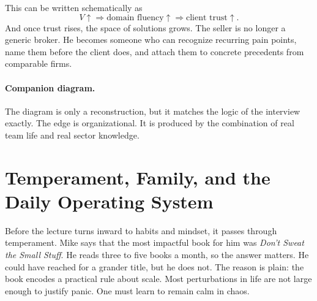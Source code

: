 This can be written schematically as
\begin{equation}
V \uparrow \Longrightarrow \text{domain fluency} \uparrow \Longrightarrow \text{client trust} \uparrow.
\end{equation}
And once trust rises, the space of solutions grows. The seller is no longer a generic broker. He becomes someone who can recognize recurring pain points, name them before the client does, and attach them to concrete precedents from comparable firms.

\paragraph{Companion diagram.}
\begin{figure}
\centering
{}
\end{figure}

The diagram is only a reconstruction, but it matches the logic of the interview exactly. The edge is organizational. It is produced by the combination of real team life and real sector knowledge.

\section{Temperament, Family, and the Daily Operating System}

Before the lecture turns inward to habits and mindset, it passes through temperament. Mike says that the most impactful book for him was \textit{Don't Sweat the Small Stuff}. He reads three to five books a month, so the answer matters. He could have reached for a grander title, but he does not. The reason is plain: the book encodes a practical rule about scale. Most perturbations in life are not large enough to justify panic. One must learn to remain calm in chaos.

